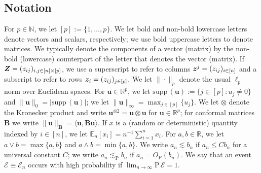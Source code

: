 \documentclass{uwstat572}
\theoremstyle{definition}
\theoremstyle{remark}
\newcommand{\R}{\ensuremath{\mathbb{R}}}
\newcommand{\N}{\mathbb{N}}
\newcommand{\gb}{\beta}
\newcommand{\gep}{\epsilon}
\newcommand{\gs}{\sigma}
\newcommand{\supp}{\mathrm{supp} \,}
\newcommand{\Prb}{\mathrm{P}}
\newcommand{\E}{\mathrm{E}}
\newcommand{\En}{\bar{\E}}
\newcommand{\Ex}{\mathbb{E}}
\newcommand{\Exn}{\Ex_n}
\newcommand{\bs}[1]{\boldsymbol{#1}}
\numberwithin{equation}{section}
\begin{document}
\subsection{Notation}
\renewcommand{\d}{\bs{d}}
\newcommand{\dhat}{\hat{\d}}
\newcommand{\dhatc}{\hat{d}}
\newcommand{\dhati}{\dhatc_i}
\newcommand{\db}{\d_{\regb}}
\renewcommand{\u}{\bs{u}}
\newcommand{\x}{\bs{x}}
\newcommand{\y}{\bs{y}}
\newcommand{\U}{\bs{U}}
\newcommand{\inn}{\in[n]}
\newcommand{\event}{\mathcal{E}}
\newcommand{\kp}{\otimes}
\newcommand{\kpt}{\kp2}
\newcommand{\B}{\bs{B}}
\newcommand{\ip}[3]{#3\langle#1,#2 #3\rangle}

For $p\in\N$, we let $[p] := \{1,\ldots,p\}$. We let bold and non-bold lowercase letters denote vectors and scalars, respectively; we use bold uppercase letters to denote matrices. We typically denote the components of a vector (matrix) by the non-bold (lowercase) counterpart of the letter that denotes the vector (matrix). If $\Z = (z_{ij})_{i,j\in[n]\times[p]}$, we use a superscript to refer to columns $\z^j = (z_{ij})_{i\inn}$ and a subscript to refer to rows $\z_i = (z_{ij})_{j\in[p]}$. We let $\|\cdot\|_p$ denote the usual $\ell_p$ norm over Euclidean spaces.  For $\u \in \R^p$, we let $\supp(\u) := \{j\in[p]: u_j \neq 0\}$ and $\|\u\|_0 = |\supp(\u)|$; we let $\|\u\|_\infty = \max_{j\in[p]} \{u_j\}$. We let $\otimes$ denote the Kronecker product and write $\u^{\kpt} = \u \kp \u$ for $\u\in\R^p$; for conformal matrices $\B$ we write $\|\u\|_{\B} = \ip{\u}{\B\u}{}$. If $x$ is a (random or deterministic) quantity indexed by $i\inn$, we let $\Exn[x_i] = n^{-1}\sum_{i=1}^n x_i$. For $a,b\in\R$, we let $a\vee b = \max\{a,b\}$ and $a\wedge b = \min\{a,b\}$. We write $a_n \lesssim b_n$ if $a_n \leq Cb_n$ for a universal constant $C$; we write $a_n \lesssim_\Prb b_n$ if $a_n = O_\Prb(b_n)$. We say that an event $\event \equiv \event_n$ occurs with high probability if $\lim_{n\to\infty} \Prb \, \event = 1$. 


%


\newcommand{\px}{p_{\x}}
\newcommand{\pu}{p_{\u}}
\newcommand{\pun}{p_{\u,n}}
\newcommand{\regb}{\bs{\gb}}
\newcommand{\regbh}{\hat{\regb}}
\newcommand{\fb}{f_{\regb}}
\newcommand{\fbn}{f_{\regb, n}}
\newcommand{\fbhat}{\hat{\fb}}
\newcommand{\rem}{\bs{r}}
\newcommand{\remc}{r}
\newcommand{\remi}{\remc_i}
\newcommand{\rfb}{r_{\famb}}
\newcommand{\rc}{c_r}
\newcommand{\rb}{r_{\regb}}
\newcommand{\rbn}{r_{\regb,n}}
\newcommand{\rfs}{r_{\fams}}
\newcommand{\Xs}{\mathcal{X}}
\newcommand{\Zs}{\mathcal{Z}}
\newcommand{\Fs}{\mathcal{F}}
\newcommand{\Bs}{\mathcal{B}}
\newcommand{\famb}{\Fs_\Bs}
\newcommand{\fams}{\Fs_\sb}
\newcommand{\Sb}{S}
\newcommand{\Us}{\mathcal{U}}
\renewcommand{\sb}{s}
\newcommand{\gramhat}{\hat{\bs{\Sigma}}}
\newcommand{\tune}{\lambda}
\newcommand{\ersi}{\gep_i}
\newcommand{\sd}{\gs}
\newcommand{\f}{\bs{f}}
\newcommand{\fhat}{\hat{\f}}
\newcommand{\fhc}{\hat{f}}
\newcommand{\ffb}{\bs{f}_{\regb}}
\end{document}
